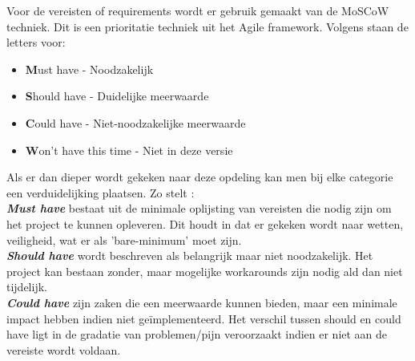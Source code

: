 %



%
Voor de vereisten of requirements wordt er gebruik gemaakt van de MoSCoW techniek. Dit is een prioritatie techniek uit het Agile framework. Volgens \textcite{2025agile} staan de letters voor:

\begin{itemize}
  \item \textbf{M}ust have - Noodzakelijk
  \item \textbf{S}hould have - Duidelijke meerwaarde
  \item \textbf{C}ould have - Niet-noodzakelijke meerwaarde
  \item \textbf{W}on't have this time - Niet in deze versie
\end{itemize}

Als er dan dieper wordt gekeken naar deze opdeling kan men bij elke categorie een verduidelijking plaatsen. Zo stelt \textcite{2025agile}:\\

\textbf{\textit{Must have}} bestaat uit de minimale oplijsting van vereisten die nodig zijn om het project te kunnen opleveren. Dit houdt in dat er gekeken wordt naar wetten, veiligheid, wat er als 'bare-minimum' moet zijn.\\

\textbf{\textit{Should have}} wordt beschreven als belangrijk maar niet noodzakelijk. Het project kan bestaan zonder, maar mogelijke workarounds zijn nodig ald dan niet tijdelijk.\\

\textbf{\textit{Could have}} zijn zaken die een meerwaarde kunnen bieden, maar een minimale impact hebben indien niet geïmplementeerd. Het verschil tussen should en could have ligt in de gradatie van problemen/pijn veroorzaakt indien er niet aan de vereiste wordt voldaan.\\

